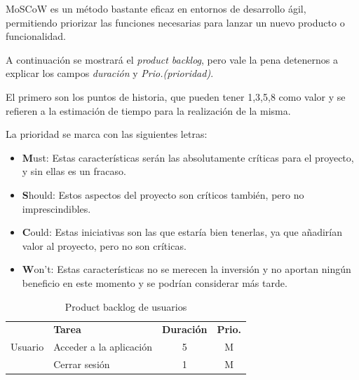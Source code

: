 MoSCoW es un método bastante eficaz en entornos de desarrollo ágil, permitiendo priorizar las funciones necesarias para lanzar un nuevo producto o funcionalidad.

A continuación se mostrará el \textit{product backlog}, pero vale la pena detenernos a explicar los campos \textit{duración} y \textit{Prio.(prioridad)}.

El primero son los puntos de historia, que pueden tener 1,3,5,8 como valor y se refieren a la estimación de tiempo para la realización de la misma.

La prioridad se marca con las siguientes letras:
\begin{itemize}
	\item  \textbf{M}ust: Estas características serán las absolutamente críticas para el proyecto, y sin ellas es un fracaso.
	\item \textbf{S}hould: Estos aspectos del proyecto son críticos también, pero no imprescindibles.
	\item \textbf{C}ould: Estas iniciativas son las que estaría bien tenerlas, ya que añadirían valor al proyecto, pero no son críticas.
	\item \textbf{W}on't: Estas características no se merecen la inversión y no aportan ningún beneficio en este momento y se podrían considerar más tarde.
\end{itemize}

\begin{table}[H]
	\centering
	\begin{tabular}{|c |p{8cm}|c |c|} \hline 
		\multirow[c]{3}{*}{Usuario}&  \textbf{Tarea}&  \textbf{Duración}& \textbf{Prio.}\\  \cline{2-4}%
		&  Acceder a la aplicación&  5& M\\ \cline{2-4} 
		&  Cerrar sesión&  1& M\\ \hline 
	\end{tabular}
	\caption{Product backlog de usuarios}
	\label{tab:pb_usuarios}
\end{table}

